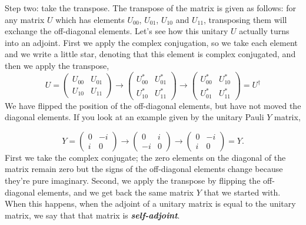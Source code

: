 Step two: take the transpose. The transpose of the matrix is given as follows: for any matrix $U$ which has elements $U_{00}$, $U_{01}$, $U_{10}$ and $U_{11}$, transposing them will exchange the off-diagonal elements. Let's see how this unitary $U$ actually turns into an adjoint. First we apply the complex conjugation, so we take each element and we write a little star, denoting that this element is complex conjugated, and then we apply the transpose,
\begin{equation}
U=\left(\begin{array}{ll}
U_{00} & U_{01} \\
U_{10} & U_{11}
\end{array}\right) \rightarrow\left(\begin{array}{cc}
U_{00}^{*} & U_{01}^{*} \\
U_{10}^{*} & U_{11}^{*}
\end{array}\right) \longrightarrow\left(\begin{array}{ll}
U_{00}^{*} & U_{10}^{*} \\
U_{01}^{*} & U_{11}^{*}
\end{array}\right)=U^{\dagger}
\end{equation}
We have flipped the position of the off-diagonal elements, but have not moved the diagonal elements. If you look at an example given by the unitary Pauli $Y$ matrix, 

\begin{equation}
Y=\left(\begin{array}{cc}
0 & -i \\
i & 0
\end{array}\right) \longrightarrow\left(\begin{array}{cc}
0 & i \\
-i & 0
\end{array}\right) \longrightarrow\left(\begin{array}{cc}
0 & -i \\
i & 0
\end{array}\right)=Y.
\end{equation}
First we take the complex conjugate; the zero elements on the diagonal of the matrix remain zero but the signs of the off-diagonal elements change because they're pure imaginary. Second, we apply the transpose by flipping the off-diagonal elements, and we get back the same matrix $Y$ that we started with. When this happens, when the adjoint of a unitary matrix is equal to the unitary matrix, we say that that matrix is \textbf{\emph{self-adjoint}}.

